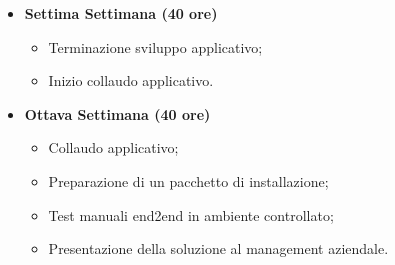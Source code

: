 {\begin{itemize}
\begin{itemize}
        	\item Sviluppo applicativo;       	
            \item Scrittura test.
        \end{itemize}
        \item \textbf{Settima Settimana (40 ore)} 
        \begin{itemize}
        	\item Terminazione sviluppo applicativo;
        	\item Inizio collaudo applicativo.            
        \end{itemize}
        \item \textbf{Ottava Settimana (40 ore)} 
        \begin{itemize}
        	\item Collaudo applicativo;
            \item Preparazione di un pacchetto di installazione;
            \item Test manuali end2end in ambiente
controllato;
			\item Presentazione della soluzione al management aziendale.
        \end{itemize}
    \end{itemize}
}

\newcommand{\totaleOre}{}

\newcommand{\obiettiviObbligatori}{
	 \item \underline{\textit{O01}}: prototipo dell'applicativo funzionante in ambiente Linux (Ubuntu);
	 \item \underline{\textit{O02}}: documentazione chiara ed appropriata mirata all'utilizzo e al mantenimento del prodotto;	
	  \item \underline{\textit{O03}}: realizzazione di test unitari per tutte le funzionalità sviluppate;
	  \item \underline{\textit{O04}}: realizzazione di una presentazione che esponga i punti salienti di quanto realizzato.
}

\newcommand{\obiettiviDesiderabili}{
	 \item \underline{\textit{D01}}: integrazione completa con il file manager del Sistema Operativo;
	 \item \underline{\textit{D02}}: gestione delle revisioni e del concurrent locking dei documenti.
}

\newcommand{\obiettiviFacoltativi}{
	 \item \underline{\textit{F01}}: realizzazione di una versione in Markdown della documentazione, da inserire nella repository del progetto.
}